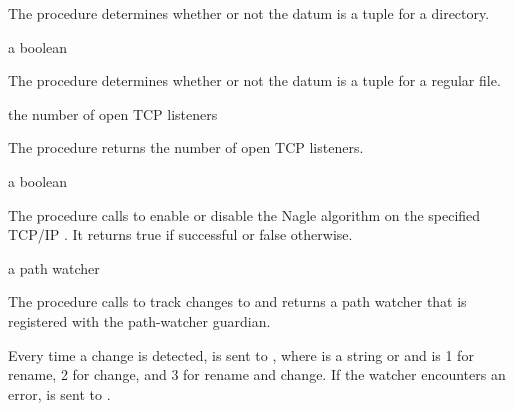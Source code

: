 The  procedure determines whether or not the
datum  is a  tuple for a directory.

\begin{procedure}
\end{procedure}
\returns{} a boolean

The  procedure determines whether or not the
datum  is a  tuple for a regular file.

\begin{procedure}
\end{procedure}
\returns{} the number of open TCP listeners

The  procedure returns the number of open TCP
listeners.

\begin{procedure}
\end{procedure}
\returns{} a boolean

The  procedure calls  to enable
or disable the Nagle algorithm on the specified TCP/IP .
It returns true if successful or false otherwise.

\begin{procedure}
\end{procedure}
\returns{} a path watcher

The  procedure calls  to track
changes to  and returns a path watcher that is registered
with the path-watcher guardian.

Every time a change is detected,  is sent to , where
 is a string or  and
 is 1 for rename, 2 for change, and 3 for rename and
change. If the watcher encounters an error,
 is sent to
.

